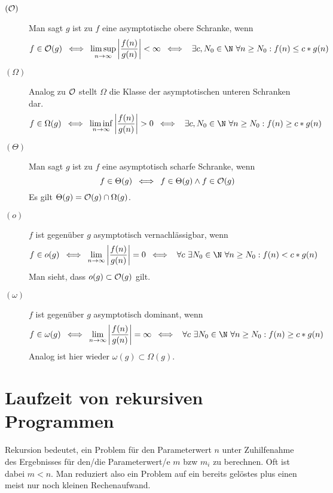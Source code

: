 \begin{description}
	\item[$(\mathcal O)$] Man sagt $g$ ist zu $f$ eine asymptotische obere Schranke, wenn
	\begin{equation*}
		f\in\O(g)\enspace\Longleftrightarrow\enspace \limsup_{n\to\infty} \left|\frac{f(n)}{g(n)}\right|<\infty\enspace\Longleftrightarrow\enspace \ \exists c,N_0\in\N\ \forall n\geq N_0:f(n)\leq c*g(n)
	\end{equation*}

	\item[$(\Omega)$] Analog zu $\mathcal O$ stellt $\Omega$ die Klasse der asymptotischen unteren Schranken dar.
	\begin{equation*}
		f\in\Omega(g) \enspace\Longleftrightarrow\enspace \liminf_{n\to\infty} \left|\frac{f(n)}{g(n)}\right|>0\enspace\Longleftrightarrow\enspace \ \exists c,N_0\in\N\ \forall n\geq N_0:f(n)\geq c*g(n)
	\end{equation*}


	\item[$(\Theta)$] Man sagt $g$ ist zu $f$ eine asymptotisch scharfe Schranke, wenn
	\begin{equation*}
		f\in\Theta(g)\enspace\Longleftrightarrow\enspace f\in\Theta(g)\wedge f\in\mathcal O(g)
	\end{equation*}
	Es gilt $\Theta(g)=\mathcal O(g)\cap \Omega(g)$.


	\item[$(o)$] $f$ ist gegenüber $g$ asymptotisch vernachlässigbar, wenn
	\begin{equation*}
		f\in o(g)\enspace\Longleftrightarrow\enspace \lim_{n\to\infty} \left|\frac{f(n)}{g(n)}\right|=0\enspace\Longleftrightarrow\enspace \ \forall c\ \exists N_0\in\N\ \forall n\geq N_0:f(n)< c*g(n)
	\end{equation*}
	Man sieht, dass $o(g)\subset \mathcal O(g)$ gilt.


	\item[$(\omega)$] $f$ ist gegenüber $g$ asymptotisch dominant, wenn
	\begin{equation*}
		f\in\omega(g) \enspace\Longleftrightarrow\enspace \lim_{n\to\infty} \left|\frac{f(n)}{g(n)}\right|=\infty\enspace\Longleftrightarrow\enspace \ \forall c\ \exists N_0\in\N\ \forall n\geq N_0:f(n)\geq c*g(n)
	\end{equation*}
	Analog ist hier wieder $\omega(g)\subset \Omega(g)$.
\end{description}


\section{Laufzeit von rekursiven Programmen}
Rekursion bedeutet, ein Problem für den Parameterwert $n$ unter Zuhilfenahme des Ergebnisses für den/die Parameterwert/e $m$ bzw $m_i$ zu berechnen.
Oft ist dabei $m<n$. Man reduziert also ein Problem auf ein bereits gelöstes plus einen meist nur noch kleinen Rechenaufwand.


